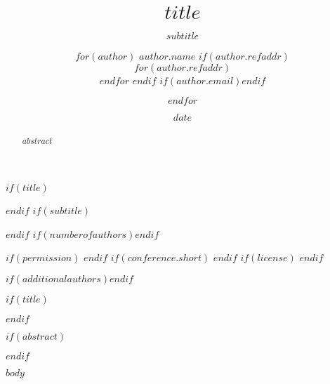\documentclass[$if(fontsize)$$fontsize$,$endif$$if(lang)$$lang$,$endif$$if(papersize)$$papersize$,$endif$]{acm_proc_article-sp}
\begin{document}
$if(title)$\title{$title$}$endif$
$if(subtitle)$\subtitle{$subtitle$}$endif$
$if(numberofauthors)$$endif$

\author{
$for(author)$
  $author.name$
  $if(author.refaddr)$
    \\
    $for(author.refaddr)$
      \\
    $endfor$
  $endif$
  $if(author.email)$$endif$
  \and
$endfor$
}

$if(permission)$
$endif$
$if(conference.short)$
$endif$
$if(license)$
$endif$

$if(additionalauthors)$$endif$

\date{$date$}

$if(title)$\maketitle$endif$

$if(abstract)$
\begin{abstract}
$abstract$
\end{abstract}
$endif$



$body$
\end{document}
